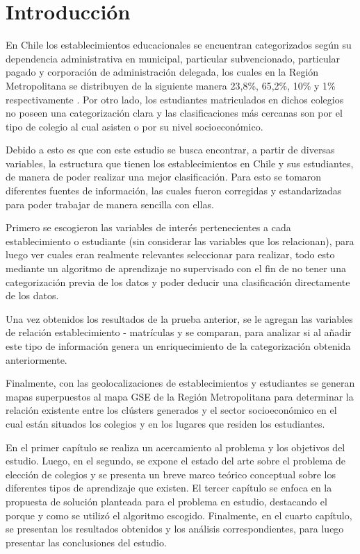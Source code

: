 \chapter*{Introducci\'on}

En Chile los establecimientos educacionales se encuentran categorizados según su dependencia administrativa en municipal, particular subvencionado, particular pagado y corporación de administración delegada, los cuales en la Región Metropolitana se distribuyen de la siguiente manera 23,8\%, 65,2\%, 10\% y 1\% respectivamente \cite{estadisticasEducacion}. Por otro lado, los estudiantes matriculados en dichos colegios no poseen una categorización clara y las clasificaciones más cercanas son por el tipo de colegio al cual asisten o por su nivel socioeconómico.

Debido a esto es que con este estudio se busca encontrar, a partir de diversas variables, la estructura que tienen los establecimientos en Chile y sus estudiantes, de manera de poder realizar una mejor clasificación. Para esto se tomaron diferentes fuentes de información, las cuales fueron corregidas y estandarizadas para poder trabajar de manera sencilla con ellas.

Primero se escogieron las variables de interés pertenecientes a cada establecimiento o estudiante (sin considerar las variables que los relacionan), para luego ver cuales eran realmente relevantes seleccionar para realizar, todo esto mediante un algoritmo de aprendizaje no supervisado con el fin de no tener una categorización previa de los datos y poder deducir una clasificación directamente de los datos.

Una vez obtenidos los resultados de la prueba anterior, se le agregan las variables de relación establecimiento - matrículas y se comparan, para analizar si al añadir este tipo de información genera un enriquecimiento de la categorización obtenida anteriormente.

Finalmente, con las geolocalizaciones de establecimientos y estudiantes se generan mapas superpuestos al mapa GSE de la Región Metropolitana para determinar la relación existente entre los clústers generados y el sector socioeconómico en el cual están situados los colegios y en los lugares que residen los estudiantes.

En el primer capítulo se realiza un acercamiento al problema y los objetivos del estudio. Luego, en el segundo, se expone el estado del arte sobre el problema de elección de colegios y se presenta un breve marco teórico conceptual sobre los diferentes tipos de aprendizaje que existen. El tercer capítulo se enfoca en la propuesta de solución planteada para el problema en estudio, destacando el porque y como se utilizó el algoritmo escogido. Finalmente, en el cuarto capítulo, se presentan los resultados obtenidos y los análisis correspondientes, para luego presentar las conclusiones del estudio.